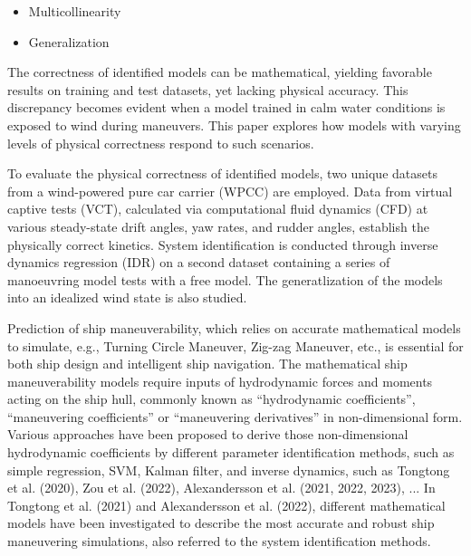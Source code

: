 %
\begin{itemize}
    \item Multicollinearity
    \item Generalization
\end{itemize}
The correctness of identified models can be mathematical, yielding favorable results on training and test datasets, yet lacking physical accuracy. This discrepancy becomes evident when a model trained in calm water conditions is exposed to wind during maneuvers. This paper explores how models with varying levels of physical correctness respond to such scenarios.

%
To evaluate the physical correctness of identified models, two unique datasets from a wind-powered pure car carrier (WPCC) are employed. Data from virtual captive tests (VCT), calculated via computational fluid dynamics (CFD) at various steady-state drift angles, yaw rates, and rudder angles, establish the physically correct kinetics. System identification is conducted through inverse dynamics regression (IDR) on a second dataset containing a series of manoeuvring model tests with a free model. The generatlization of the models into an idealized wind state is also studied. 

Prediction of ship maneuverability, which relies on accurate mathematical models to simulate, e.g., Turning Circle Maneuver, Zig-zag Maneuver, etc., is essential for both ship design and intelligent ship navigation. The mathematical ship maneuverability models require inputs of hydrodynamic forces and moments acting on the ship hull, commonly known as “hydrodynamic coefficients”, “maneuvering coefficients” or “maneuvering derivatives” in non-dimensional form. Various approaches have been proposed to derive those non-dimensional hydrodynamic coefficients by different parameter identification methods, such as simple regression, SVM, Kalman filter, and inverse dynamics, such as Tongtong et al. (2020), Zou et al. (2022), Alexandersson et al. (2021, 2022, 2023), ... In Tongtong et al. (2021) and Alexandersson et al. (2022), different mathematical models have been investigated to describe the most accurate and robust ship maneuvering simulations, also referred to the system identification methods.

